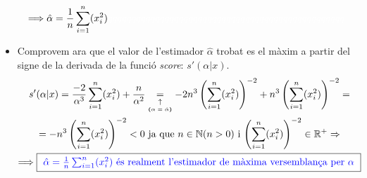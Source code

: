 \documentclass[12pt]{article}
\begin{document}
\begin{itemize}
\begin{multline*}
        \Longrightarrow \hat{\alpha} = \frac{1}{n}\sum_{i=1}^{n}(x_i^2) \textcolor{white}{qqqqqqqqqqqqqqqqqqqqqqqqqqqqqqqqqqqqqqqqqqqqqqqqqq}
    \end{multline*}
    \item Comprovem ara que el valor de l'estimador $\hat{\alpha}$ trobat es el màxim a partir del signe de la derivada de la funció \textit{score}: $s'(\alpha|x)$.
    \begin{multline}
        s'(\alpha|x)=\frac{-2}{\alpha^3}\sum_{i=1}^{n}(x_i^2)+\frac{n}{\alpha^2}\underset{\underset{\textbf{(\textit{$\alpha=\hat{\alpha}$})}}{\uparrow}}{=}-2n^3\left(\sum_{i=1}^{n}(x_i^2)\right)^{-2} + n^3 \left(\sum_{i=1}^{n}(x_i^2)\right)^{-2} = \\= -n^3\left(\sum_{i=1}^{n}(x_i^2)\right)^{-2} < 0 \text{ ja que $n\in\mathbb{N}$($n>0$) i $\left(\sum_{i=1}^{n}(x_i^2)\right)^{-2}\in\mathbb{R^+}$} \Rightarrow\\ \Longrightarrow  \fcolorbox{black}{white}{ \textcolor{blue}{$\hat{\alpha} = \frac{1}{n}\sum_{i=1}^{n}(x_i^2) $ és realment l'estimador de màxima versemblança per  $\alpha$} } \label{score}
    \end{multline}
\end{itemize}
\newpage
\end{document}
